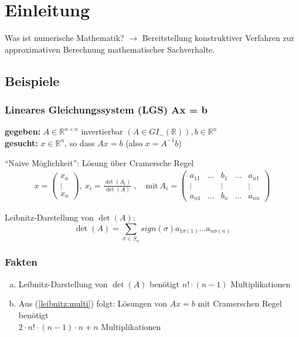 \section{Einleitung}
Was ist numerische Mathematik?
$\rightarrow$ Bereitstellung konstruktiver Verfahren zur
approximativen Berechnung mathematischer Sachverhalte.

\subsection{Beispiele}

\subsubsection{Lineares Gleichungssystem (LGS) Ax = b}
\textbf{gegeben:} $A \in \mathbb{R}^{n \times n}$ invertierbar
$(A \in GI_{\sim} (\mathbb{R})), b \in \mathbb{R}^n$ \\
\textbf{gesucht:} $x \in \mathbb{R}^n$, so dass $Ax = b$ (also $x = A^{-1} b$)

"`Naive Möglichkeit"': Lösung über Cramersche Regel
\begin{align}
\label{cramer}
x = \begin{pmatrix} x_a \\ \vdots \\ x_n \end{pmatrix},
~ x_i = \frac{\det(A_i)}{\det (A)} \;, \quad
 \text{mit}~
A_i = \begin{pmatrix} a_{11} & \dots & b_1 & \dots & a_{n1}
\\ \vdots & & \vdots & & \vdots \\ a_{n1} & \dots & b_n &
\dots & a_{nn} \end{pmatrix}
\end{align}

Leibnitz-Darstellung von $\det(A)$:
\begin{displaymath}
\det(A) = \sum_{\sigma \in S_n} sign (\sigma) a_{1\sigma(1)}
\dots a_{n\sigma(n)}
\end{displaymath}

\subsubsection{Fakten}
\begin{enumerate}[(a)]
\item\label{leibnitz:multi}
Leibnitz-Darstellung von $\det(A)$ benötigt $n! \cdot (n-1)$ Multiplikationen
\item
Aus (\ref{leibnitz:multi}) folgt: Lösungen von $Ax=b$ mit Cramerschen Regel benötigt \\
$2 \cdot  n!\cdot(n-1) \cdot n + n$ Multiplikationen
\end{enumerate}

